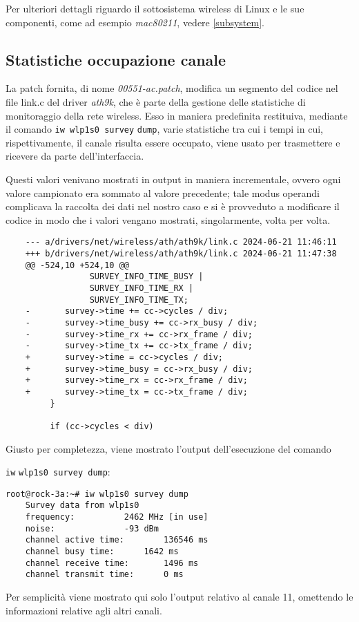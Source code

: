 Per ulteriori dettagli riguardo il sottosistema wireless di Linux e le sue componenti, come ad esempio \textit{mac80211}, vedere \autoref{subsystem}.

\subsection[Statistiche occupazione canale]{Statistiche occupazione canale}
La patch fornita, di nome \textit{00551-ac.patch}, modifica un segmento del codice nel file link.c del driver \textit{ath9k}, che è parte della gestione delle statistiche di monitoraggio della rete wireless. Esso in maniera predefinita restituiva, mediante il comando \verb|iw wlp1s0 survey| \verb|dump|, varie statistiche tra cui i tempi in cui, rispettivamente, il canale risulta essere occupato, viene usato per trasmettere e ricevere da parte dell'interfaccia. 

Questi valori venivano mostrati in output in maniera incrementale, ovvero ogni valore campionato era sommato al valore precedente; tale modus operandi complicava la raccolta dei dati nel nostro caso e si è provveduto a modificare il codice in modo che i valori vengano mostrati, singolarmente, volta per volta.
\begin{lstlisting}
    --- a/drivers/net/wireless/ath/ath9k/link.c	2024-06-21 11:46:11
    +++ b/drivers/net/wireless/ath/ath9k/link.c	2024-06-21 11:47:38
    @@ -524,10 +524,10 @@
                 SURVEY_INFO_TIME_BUSY |
                 SURVEY_INFO_TIME_RX |
                 SURVEY_INFO_TIME_TX;
    -		survey->time += cc->cycles / div;
    -		survey->time_busy += cc->rx_busy / div;
    -		survey->time_rx += cc->rx_frame / div;
    -		survey->time_tx += cc->tx_frame / div;
    +		survey->time = cc->cycles / div;
    +		survey->time_busy = cc->rx_busy / div;
    +		survey->time_rx = cc->rx_frame / div;
    +		survey->time_tx = cc->tx_frame / div;
         }
     
         if (cc->cycles < div)
\end{lstlisting}
Giusto per completezza, viene mostrato l'output dell'esecuzione del comando 

\verb|iw| \verb|wlp1s0 survey dump|:
\begin{lstlisting}
root@rock-3a:~# iw wlp1s0 survey dump
    Survey data from wlp1s0
	frequency:			2462 MHz [in use]
	noise:				-93 dBm
	channel active time:		136546 ms
	channel busy time:		1642 ms
	channel receive time:		1496 ms
	channel transmit time:		0 ms
\end{lstlisting}
Per semplicità viene mostrato qui solo l'output relativo al canale 11, omettendo le informazioni relative agli altri canali.

